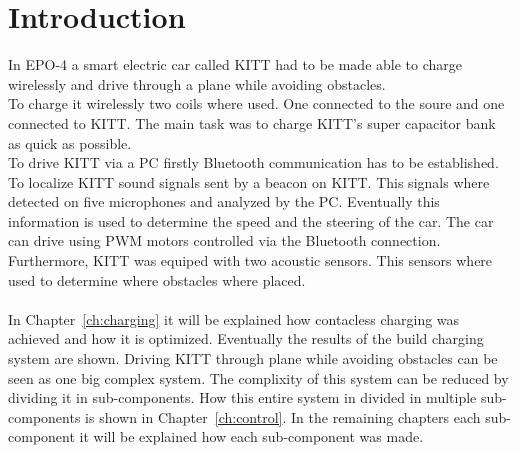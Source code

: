 \documentclass[11pt,titlepage]{report}
\begin{document}
\chapter{Introduction}
In EPO-4 a smart electric car called KITT had to be made able to charge wirelessly and drive through a plane while avoiding obstacles. \\
To charge it wirelessly two coils where used. One connected to the soure and one connected to KITT. The main task was to charge KITT's super capacitor bank as quick as possible. \\
To drive KITT via a PC firstly Bluetooth communication has to be established. To localize KITT sound signals sent by a beacon on KITT. This signals where detected on five microphones and analyzed by the PC. Eventually this information is used to determine the speed and the steering of the car. The car can drive using PWM motors controlled via the Bluetooth connection. Furthermore, KITT was equiped with two acoustic sensors. This sensors where used to determine where obstacles where placed. \\ \\ 

In Chapter~\ref{ch:charging} it will be explained how contacless charging was achieved and how it is optimized. Eventually the results of the build charging system are shown. 
Driving KITT through plane while avoiding obstacles can be seen as one big complex system. The complixity of this system can be reduced by dividing it in sub-components. How this entire system in divided in multiple sub-components is shown in Chapter~\ref{ch:control}. In the remaining chapters each sub-component it will be explained how each sub-component was made. 
\end{document}
